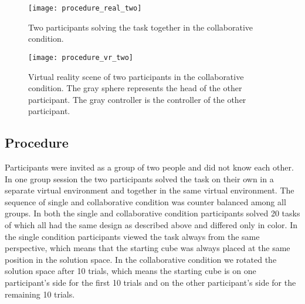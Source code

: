 \begin{figure}[h]
\centering
\texttt{[image: procedure\_real\_two]}
\caption{Two participants solving the task together in the collaborative condition.} \label{fig:procedure_real_two}
\end{figure}

\begin{figure}[h]
\centering
\texttt{[image: procedure\_vr\_two]}
\caption{Virtual reality scene of two participants in the collaborative condition. The gray sphere represents the head of the other participant. The gray controller is the controller of the other participant.}
\label{fig:procedure_vr_two}
\end{figure}

\newpage

\subsection{Procedure}
Participants were invited as a group of two people and did not know each other. In one group session the two participants solved the task on their own in a separate virtual environment and together in the same virtual environment. The sequence of single and collaborative condition was counter balanced among all groups. In both the single and collaborative condition participants solved 20 tasks of which all had the same design as described above and differed only in color. In the single condition participants viewed the task always from the same perspective, which means that the starting cube was always placed at the same position in the solution space.
In the collaborative condition we rotated the solution space after 10 trials, which means the starting cube is on one participant's side for the first 10 trials and on the other participant's side for the remaining 10 trials. 

